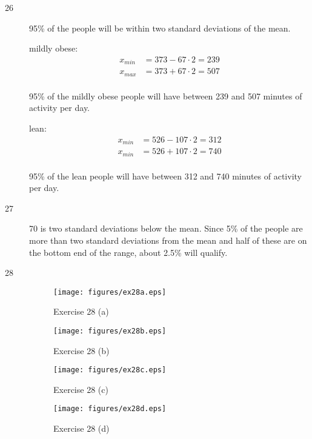 \documentclass[letterpaper, landscape]{exam}
\begin{document}
    \begin{description}
      \item[26] 95\% of the people will be within two standard deviations of the mean.  

        mildly obese:
        \begin{align*}
          x_{min} &= 373 - 67 \cdot 2 = 239 \\
          x_{max} &= 373 + 67 \cdot 2 = 507 \\
        \end{align*}

        95\% of the mildly obese people will have between 239 and 507 minutes of activity
        per day.

        lean:
        \begin{align*}
          x_{min} &= 526 - 107 \cdot 2 = 312 \\
          x_{min} &= 526 + 107 \cdot 2 = 740 \\
        \end{align*}

        95\% of the lean people will have between 312 and 740 minutes of activity per day.

      \item[27]
        70 is two standard deviations below the mean.  Since 5\% of the people are more
        than two standard deviations from the mean and half of these are on the bottom end
        of the range, about 2.5\% will qualify. 

      \item[28]

        \begin{figure}[H]
          \centering
          \texttt{[image: figures/ex28a.eps]}
          \caption{Exercise 28 (a)}
        \end{figure}

        \begin{figure}[H]
          \centering
          \texttt{[image: figures/ex28b.eps]}
          \caption{Exercise 28 (b)}
        \end{figure}

        \begin{figure}[H]
          \centering
          \texttt{[image: figures/ex28c.eps]}
          \caption{Exercise 28 (c)}
        \end{figure}

        \begin{figure}[H]
          \centering
          \texttt{[image: figures/ex28d.eps]}
          \caption{Exercise 28 (d)}
        \end{figure}


\end{description}
\end{document}
